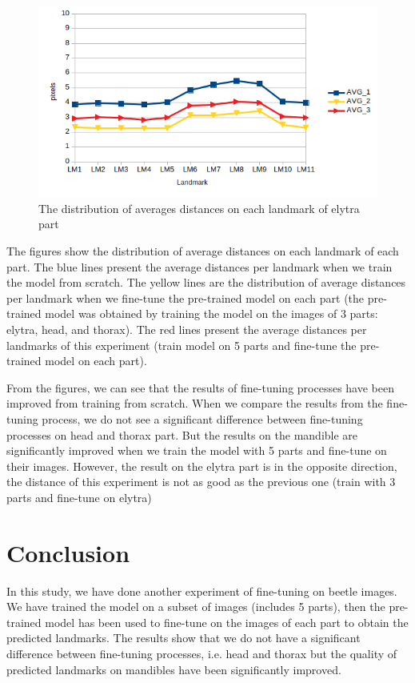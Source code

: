 \documentclass[12pt, a4paper]{article}
\begin{document}
\begin{figure}[!h]
	\caption{The distribution of averages distances on each landmark of elytra part}
	\centering
	\includegraphics[scale=.8]{images/5parts/elytre.png}
\end{figure}
The figures show the distribution of average distances on each landmark of each part. The blue lines present the average distances per landmark when we train the model from scratch. The yellow lines are the distribution of average distances per landmark when we fine-tune the pre-trained model on each part (the pre-trained model was obtained by training the model on the images of 3 parts: elytra, head, and thorax). The red lines present the average distances per landmarks of this experiment (train model on 5 parts and fine-tune the pre-trained model on each part).

From the figures, we can see that the results of fine-tuning processes have been improved from training from scratch. When we compare the results from the fine-tuning process, we do not see a significant difference between fine-tuning processes on head and thorax part. But the results on the mandible are significantly improved when we train the model with 5 parts and fine-tune on their images. However, the result on the elytra part is in the opposite direction, the distance of this experiment is not as good as the previous one (train with 3 parts and fine-tune on elytra)
\section{Conclusion}
In this study, we have done another experiment of fine-tuning on beetle images. We have trained the model on a subset of images (includes 5 parts), then the pre-trained model has been used to fine-tune on the images of each part to obtain the predicted landmarks. The results show that we do not have a significant difference between fine-tuning processes, i.e. head and thorax but the quality of predicted landmarks on mandibles have been significantly improved.
\end{document}

